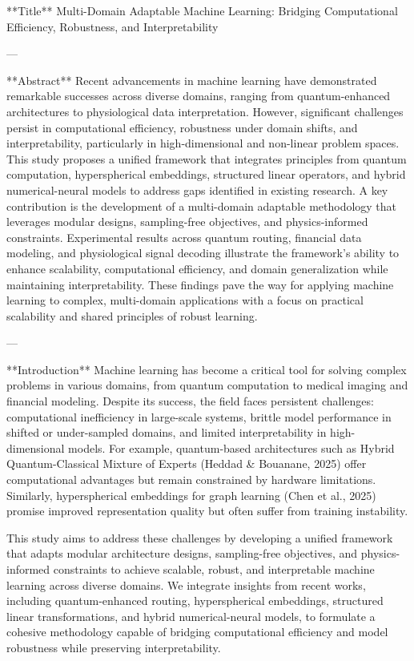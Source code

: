**Title**  
Multi-Domain Adaptable Machine Learning: Bridging Computational Efficiency, Robustness, and Interpretability  

---

**Abstract**  
Recent advancements in machine learning have demonstrated remarkable successes across diverse domains, ranging from quantum-enhanced architectures to physiological data interpretation. However, significant challenges persist in computational efficiency, robustness under domain shifts, and interpretability, particularly in high-dimensional and non-linear problem spaces. This study proposes a unified framework that integrates principles from quantum computation, hyperspherical embeddings, structured linear operators, and hybrid numerical-neural models to address gaps identified in existing research. A key contribution is the development of a multi-domain adaptable methodology that leverages modular designs, sampling-free objectives, and physics-informed constraints. Experimental results across quantum routing, financial data modeling, and physiological signal decoding illustrate the framework's ability to enhance scalability, computational efficiency, and domain generalization while maintaining interpretability. These findings pave the way for applying machine learning to complex, multi-domain applications with a focus on practical scalability and shared principles of robust learning.

---

**Introduction**  
Machine learning has become a critical tool for solving complex problems in various domains, from quantum computation to medical imaging and financial modeling. Despite its success, the field faces persistent challenges: computational inefficiency in large-scale systems, brittle model performance in shifted or under-sampled domains, and limited interpretability in high-dimensional models. For example, quantum-based architectures such as Hybrid Quantum-Classical Mixture of Experts (Heddad & Bouanane, 2025) offer computational advantages but remain constrained by hardware limitations. Similarly, hyperspherical embeddings for graph learning (Chen et al., 2025) promise improved representation quality but often suffer from training instability.  

This study aims to address these challenges by developing a unified framework that adapts modular architecture designs, sampling-free objectives, and physics-informed constraints to achieve scalable, robust, and interpretable machine learning across diverse domains. We integrate insights from recent works, including quantum-enhanced routing, hyperspherical embeddings, structured linear transformations, and hybrid numerical-neural models, to formulate a cohesive methodology capable of bridging computational efficiency and model robustness while preserving interpretability.  

